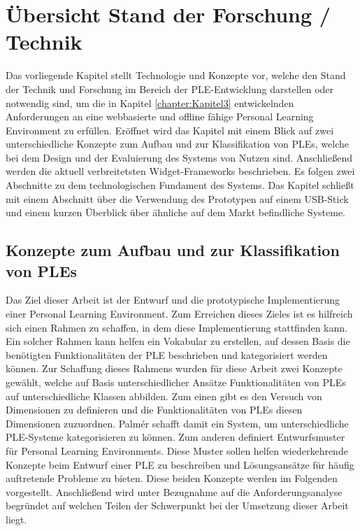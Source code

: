 \chapter{Übersicht Stand der Forschung / Technik} 
\label{chapter:Kapitel4}

Das vorliegende Kapitel stellt Technologie und Konzepte vor, welche den Stand der Technik und Forschung im Bereich der PLE-Entwicklung darstellen oder notwendig sind, um die in Kapitel \ref{chapter:Kapitel3} entwickelnden Anforderungen an eine webbasierte und offline fähige Personal Learning Environment zu erfüllen. Eröffnet wird das Kapitel mit einem Blick auf zwei unterschiedliche Konzepte zum Aufbau und zur Klassifikation von PLEs, welche bei dem Design und der Evaluierung des Systems von Nutzen sind. Anschließend werden die aktuell verbreitetsten Widget-Frameworks beschrieben. Es folgen zwei Abschnitte zu dem technologischen Fundament des Systems. Das Kapitel schließt mit einem Abschnitt über die Verwendung des Prototypen auf einem USB-Stick und einem kurzen Überblick über ähnliche auf dem Markt befindliche Systeme. 

\section{Konzepte zum Aufbau und zur Klassifikation von PLEs}
Das Ziel dieser Arbeit ist der Entwurf und die prototypische Implementierung einer Personal Learning Environment. Zum Erreichen dieses Zieles ist es hilfreich sich einen Rahmen zu schaffen, in dem diese Implementierung stattfinden kann. Ein solcher Rahmen kann helfen ein Vokabular zu erstellen, auf dessen Basis die benötigten Funktionalitäten der PLE  beschrieben und kategorisiert werden können. Zur Schaffung dieses Rahmens wurden für diese Arbeit zwei Konzepte gewählt, welche auf Basis unterschiedlicher Ansätze Funktionalitäten von PLEs auf unterschiedliche Klassen abbilden. Zum einen gibt es den Versuch von \cite{Palmer2009} Dimensionen zu definieren und die Funktionalitäten von PLEs diesen Dimensionen zuzuordnen. Palmér schafft damit ein System, um unterschiedliche PLE-Systeme kategorisieren zu können. Zum anderen definiert \cite{Wilson2008} Entwurfsmuster für Personal Learning Environments. Diese Muster sollen helfen wiederkehrende Konzepte beim Entwurf einer PLE zu beschreiben und Lösungsansätze für häufig auftretende Probleme zu bieten. Diese beiden Konzepte werden im Folgenden vorgestellt. Anschließend wird unter Bezugnahme auf die Anforderungsanalyse begründet auf welchen Teilen der Schwerpunkt bei der Umsetzung dieser Arbeit liegt.

